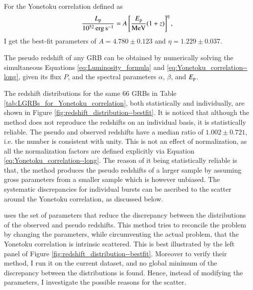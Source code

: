 For the Yonetoku correlation defined as 
\begin{equation}
\dfrac{ L_{\rm p} }{10^{52} \, \rm erg \, s^{-1}} = A \left[ \dfrac{E_{\rm p}}{ {\rm MeV} } (1+z) \right]^{\eta},
\label{eq:Yonetoku_correlation--long}
\end{equation} I get the best-fit parameters of $A = 4.780 \pm 0.123$ and $\eta = 1.229 \pm 0.037$.

The pseudo redshift of any GRB can be obtained by numerically solving the simultaneous Equations \ref{eq:Luminosity_formula} and \ref{eq:Yonetoku_correlation--long}, given its flux $P$, and the spectral parameters $\alpha$, $\beta$, and $E_{\rm p}$.

The redshift distributions for the same $66$ GRBs in Table \ref{tab:LGRBs_for_Yonetoku_correlation}, both statistically and individually, are shown in Figure \ref{fig:redshift_distribution--bestfit}. It is noticed that although the method does not reproduce the redshifts on an individual basis, it is statistically reliable. The pseudo and observed redshifts have a median ratio of $1.002 \pm 0.721$, i.e. the number is consistent with unity. This is not an effect of normalization, as all the normalization factors are defined explicitly via Equation \ref{eq:Yonetoku_correlation--long}. The reason of it being statistically reliable is that, the method produces the pseudo redshifts of a larger sample by assuming gross parameters from a smaller sample which is however unbiased. The systematic discrepancies for individual bursts can be ascribed to the scatter around the Yonetoku correlation, as discussed below.

 uses the set of parameters that reduce the discrepancy between the distributions of the observed and pseudo redshifts. This method tries to reconcile the problem by changing the parameters, while circumventing the actual problem, that the Yonetoku correlation is intrinsic scattered. This is best illustrated by the left panel of Figure \ref{fig:redshift_distribution--bestfit}. Moreover to verify their method, I run it on the current dataset, and no global minimum of the discrepancy between the distributions is found. Hence, instead of modifying the parameters, I investigate the possible reasons for the scatter.


